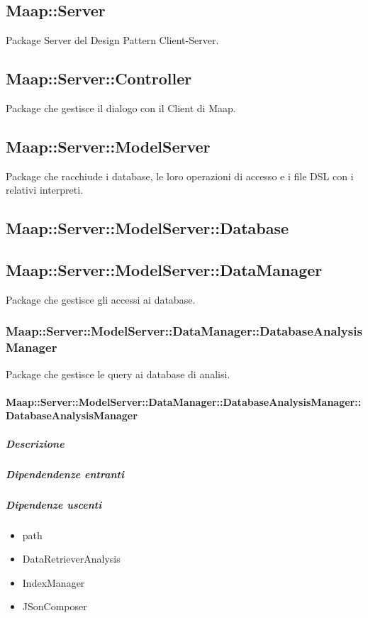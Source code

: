 \subsection{Maap::Server}
Package Server del Design Pattern Client-Server. 

\subsection{Maap::Server::Controller}
Package che gestisce il dialogo con il Client di Maap. 

\subsection{Maap::Server::ModelServer}
Package che racchiude i database, le loro operazioni di accesso e i file 
DSL con i relativi interpreti.

\subsection{Maap::Server::ModelServer::Database}

\subsection{Maap::Server::ModelServer::DataManager}
Package che gestisce gli accessi ai database.

\subsubsection{Maap::Server::ModelServer::DataManager::DatabaseAnalysisManager}
Package che gestisce le query ai database di analisi. 

\paragraph{Maap::Server::ModelServer::DataManager::DatabaseAnalysisManager::DatabaseAnalysisManager}

\subparagraph{Descrizione}

\subparagraph{Dipendendenze entranti}

\subparagraph{Dipendenze uscenti}
\begin{itemize}
\item{path}
\item{DataRetrieverAnalysis}
\item{IndexManager}
\item{JSonComposer}
\end{itemize}

